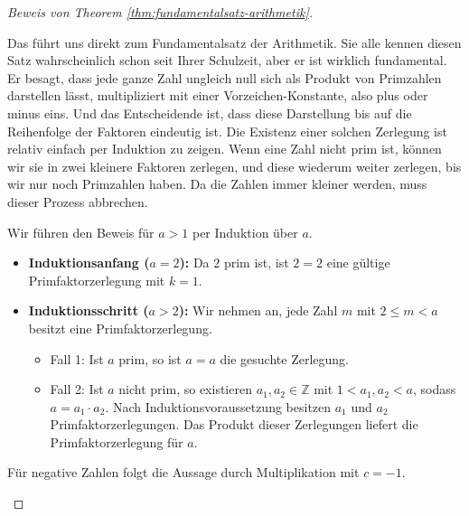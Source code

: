 \begin{math-stroke}
\end{math-stroke}

\begin{proof}[Beweis von Theorem \ref{thm:fundamentalsatz-arithmetik}]
\begin{spoken-clean}[00:47:15 - 00:50:00]
Das führt uns direkt zum Fundamentalsatz der Arithmetik. Sie alle kennen diesen Satz wahrscheinlich schon seit Ihrer Schulzeit, aber er ist wirklich fundamental. Er besagt, dass jede ganze Zahl ungleich null sich als Produkt von Primzahlen darstellen lässt, multipliziert mit einer Vorzeichen-Konstante, also plus oder minus eins. Und das Entscheidende ist, dass diese Darstellung bis auf die Reihenfolge der Faktoren eindeutig ist. Die Existenz einer solchen Zerlegung ist relativ einfach per Induktion zu zeigen. Wenn eine Zahl nicht prim ist, können wir sie in zwei kleinere Faktoren zerlegen, und diese wiederum weiter zerlegen, bis wir nur noch Primzahlen haben. Da die Zahlen immer kleiner werden, muss dieser Prozess abbrechen.
\end{spoken-clean}

\begin{math-stroke}
\begin{short-proof}
Wir führen den Beweis für $a > 1$ per Induktion über $a$.
\begin{itemize}
    \item \textbf{Induktionsanfang ($a = 2$):} Da $2$ prim ist, ist $2 = 2$ eine gültige Primfaktorzerlegung mit $k=1$.
    \item \textbf{Induktionsschritt ($a > 2$):} Wir nehmen an, jede Zahl $m$ mit $2 \le m < a$ besitzt eine Primfaktorzerlegung.
    \begin{itemize}
        \item Fall 1: Ist $a$ prim, so ist $a = a$ die gesuchte Zerlegung.
        \item Fall 2: Ist $a$ nicht prim, so existieren $a_1, a_2 \in \mathbb{Z}$ mit $1 < a_1, a_2 < a$, sodass $a = a_1 \cdot a_2$. Nach Induktionsvoraussetzung besitzen $a_1$ und $a_2$ Primfaktorzerlegungen. Das Produkt dieser Zerlegungen liefert die Primfaktorzerlegung für $a$.
    \end{itemize}
\end{itemize}
Für negative Zahlen folgt die Aussage durch Multiplikation mit $c = -1$.
\end{short-proof}
\end{math-stroke}


\end{proof}
